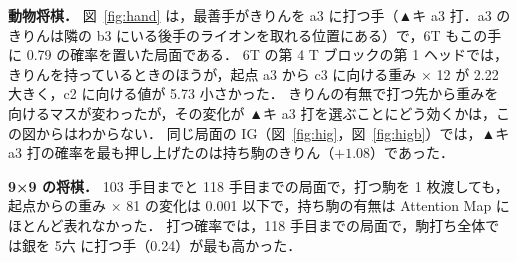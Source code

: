 \documentclass[submit]{ipsj}
\begin{document}
\textbf{動物将棋．}
図~\ref{fig:hand} は，最善手がきりんを a3 に打つ手（▲キ a3 打．a3 のきりんは隣の b3 にいる後手のライオンを取れる位置にある）で，6T もこの手に 0.79 の確率を置いた局面である．
6T の第 4 T ブロックの第 1 ヘッドでは，きりんを持っているときのほうが，起点 a3 から c3 に向ける重み × 12 が 2.22 大きく，c2 に向ける値が 5.73 小さかった．
きりんの有無で打つ先から重みを向けるマスが変わったが，その変化が ▲キ a3 打を選ぶことにどう効くかは，この図からはわからない．
同じ局面の IG（図~\ref{fig:hig}，図~\ref{fig:higb}）では，▲キ a3 打の確率を最も押し上げたのは持ち駒のきりん（$+1.08$）であった．

\textbf{9×9 の将棋．}
103 手目までと 118 手目までの局面で，打つ駒を 1 枚渡しても，起点からの重み × 81 の変化は 0.001 以下で，持ち駒の有無は Attention Map にほとんど表れなかった．
打つ確率では，118 手目までの局面で，駒打ち全体では銀を 5六 に打つ手（0.24）が最も高かった．
\end{document}
